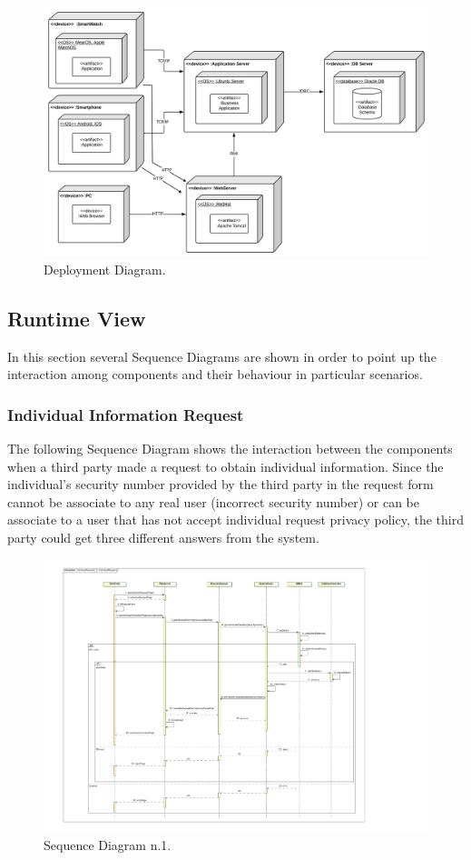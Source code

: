 \begin{figure}[H]
\centering
\includegraphics[scale=0.12]{Images/DeploymentDiagram.png}
\caption{Deployment Diagram.}
\end{figure}
\newpage

\subsection{Runtime View}
In this section several Sequence Diagrams are shown in order to point up the interaction among components and their behaviour in particular scenarios.
\subsubsection{Individual Information Request}
The following Sequence Diagram shows the interaction between the components when a third party made a request to obtain individual information. Since the individual's security number provided by the third party in the request form cannot be associate to any real user (incorrect security number) or can be associate to a user that has not accept individual request privacy policy, the third party could get three different answers from the system.
\\[1.0cm]
\begin{figure}[H]
\centering
\includegraphics[scale=0.8, angle=0,origin=c]{Images/SequenceDiagrams/IndividualRequest.pdf}
\caption{Sequence Diagram n.1.}
\clearpage
\end{figure}
\newpage
